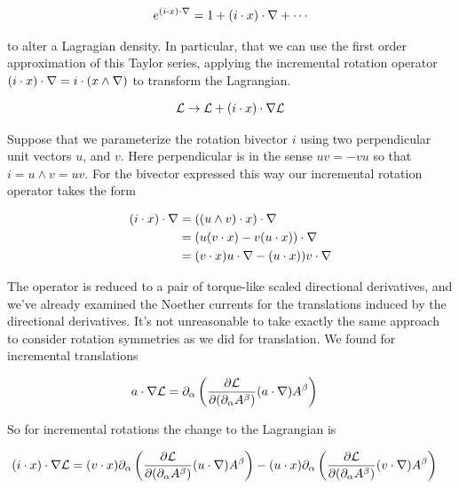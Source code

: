 \begin{align}\label{eqn:rotationCurrents:foo1}
e^{(i \cdot x) \cdot \nabla} = 1 + (i \cdot x) \cdot \nabla + \cdots
\end{align}

to alter a Lagragian density.  In particular, that we can use the first order approximation of this Taylor series, applying the incremental rotation operator $(i \cdot x) \cdot \nabla = i \cdot (x \wedge \nabla)$ to transform the Lagrangian.

\begin{align}\label{eqn:rotationCurrents:foo2}
\mathcal{L} \rightarrow \mathcal{L} + (i \cdot x) \cdot \nabla \mathcal{L}
\end{align}

Suppose that we parameterize the rotation bivector $i$ using two perpendicular unit vectors $u$, and $v$.  Here perpendicular is in the sense $u v = -v u$ so that $i = u \wedge v = u v$.  For the bivector expressed this way our incremental rotation operator takes the form

\begin{align*}
(i \cdot x) \cdot \nabla 
&=
((u \wedge v) \cdot x) \cdot \nabla \\
&=
(u (v \cdot x) - v (u \cdot x)) \cdot \nabla \\
&=
(v \cdot x) u \cdot \nabla - (u \cdot x)) v \cdot \nabla \\
\end{align*}

The operator is reduced to a pair of torque-like scaled directional derivatives, and we've already examined the Noether currents for the translations induced by the directional derivatives.  It's not unreasonable to take exactly the same approach to consider rotation symmetries as we did for translation.  We found for incremental translations

\begin{align}\label{eqn:rotationCurrents:foo3}
a \cdot \nabla \mathcal{L}
&=
\partial_\alpha \left(
\frac{\partial {\mathcal{L}}}{\partial {(\partial_\alpha A^\beta)}} (a \cdot \nabla) {A^\beta}
\right) 
\end{align}

So for incremental rotations the change to the Lagrangian is 

\begin{align}\label{eqn:rotationCurrents:foo4}
(i \cdot x) \cdot \nabla \mathcal{L}
&=
(v \cdot x)
\partial_\alpha \left(
\frac{\partial {\mathcal{L}}}{\partial {(\partial_\alpha A^\beta)}} (u \cdot \nabla) {A^\beta}
\right) 
-(u \cdot x)
\partial_\alpha \left(
\frac{\partial {\mathcal{L}}}{\partial {(\partial_\alpha A^\beta)}} (v \cdot \nabla) {A^\beta}
\right) 
\end{align}

